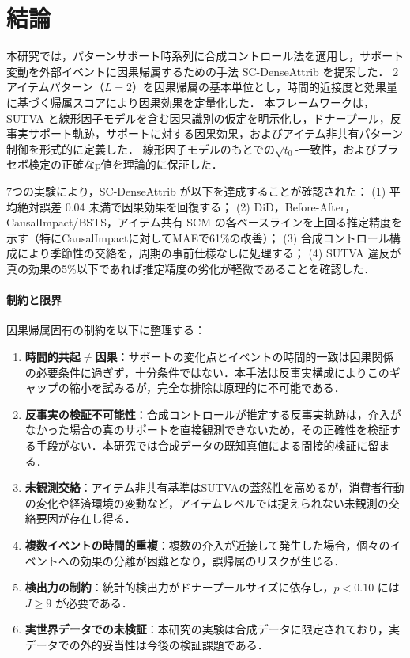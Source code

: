 \section{結論}
\label{sec:conclusion}

本研究では，パターンサポート時系列に合成コントロール法を適用し，サポート変動を外部イベントに因果帰属するための手法 SC-DenseAttrib を提案した．
2アイテムパターン（$L=2$）を因果帰属の基本単位とし，時間的近接度と効果量に基づく帰属スコアにより因果効果を定量化した．
本フレームワークは，SUTVA と線形因子モデルを含む因果識別の仮定を明示化し，ドナープール，反事実サポート軌跡，サポートに対する因果効果，およびアイテム非共有パターン制御を形式的に定義した．
線形因子モデルのもとでの$\sqrt{t_0}$-一致性，およびプラセボ検定の正確なp値を理論的に保証した．

7つの実験により，SC-DenseAttrib が以下を達成することが確認された：
(1) 平均絶対誤差 0.04 未満で因果効果を回復する；
(2) DiD，Before-After，CausalImpact/BSTS，アイテム共有 SCM の各ベースラインを上回る推定精度を示す（特にCausalImpactに対してMAEで61\%の改善）；
(3) 合成コントロール構成により季節性の交絡を，周期の事前仕様なしに処理する；
(4) SUTVA 違反が真の効果の5\%以下であれば推定精度の劣化が軽微であることを確認した．

\paragraph{制約と限界}
因果帰属固有の制約を以下に整理する：
\begin{enumerate}
    \item \textbf{時間的共起$\neq$因果}：サポートの変化点とイベントの時間的一致は因果関係の必要条件に過ぎず，十分条件ではない．本手法は反事実構成によりこのギャップの縮小を試みるが，完全な排除は原理的に不可能である．
    \item \textbf{反事実の検証不可能性}：合成コントロールが推定する反事実軌跡は，介入がなかった場合の真のサポートを直接観測できないため，その正確性を検証する手段がない．本研究では合成データの既知真値による間接的検証に留まる．
    \item \textbf{未観測交絡}：アイテム非共有基準はSUTVAの蓋然性を高めるが，消費者行動の変化や経済環境の変動など，アイテムレベルでは捉えられない未観測の交絡要因が存在し得る．
    \item \textbf{複数イベントの時間的重複}：複数の介入が近接して発生した場合，個々のイベントへの効果の分離が困難となり，誤帰属のリスクが生じる．
    \item \textbf{検出力の制約}：統計的検出力がドナープールサイズに依存し，$p < 0.10$ には $J \geq 9$ が必要である．
    \item \textbf{実世界データでの未検証}：本研究の実験は合成データに限定されており，実データでの外的妥当性は今後の検証課題である．
\end{enumerate}

